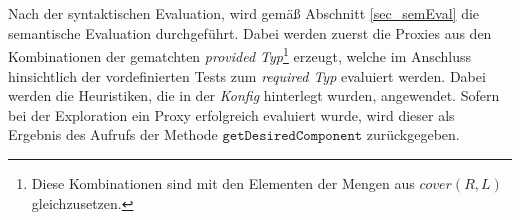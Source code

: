 \\\\
Nach der syntaktischen Evaluation, wird gemäß Abschnitt \ref{sec_semEval} die semantische Evaluation durchgeführt. Dabei werden zuerst die Proxies aus den Kombinationen der gematchten \emph{provided Typ}\footnote{Diese Kombinationen sind mit den Elementen der Mengen aus $\mathit{cover(R,L)}$ gleichzusetzen.} erzeugt, welche im Anschluss hinsichtlich der vordefinierten Tests zum \emph{required Typ} evaluiert werden. Dabei werden die Heuristiken, die in der \emph{Konfig} hinterlegt wurden, angewendet. Sofern bei der Exploration ein Proxy erfolgreich evaluiert wurde, wird dieser als Ergebnis des Aufrufs der Methode $\texttt{getDesiredComponent}$ zurückgegeben. 
